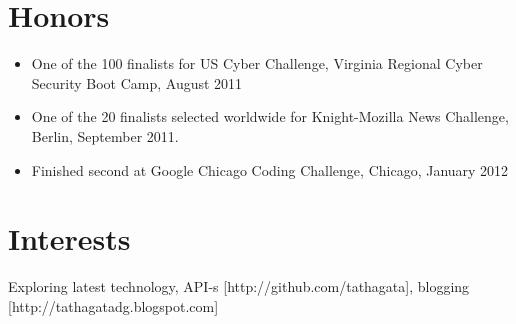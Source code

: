 \documentclass[a4paper, oneside, final]{scrartcl}
\begin{document}
\begin{center}
\begin{tabularx}{0.98\linewidth}{>{\raggedleft\scshape}p{2cm}X}
\end{tabularx}







\section{Honors}
\begin{itemize}
\small\sffamily{}
\item One of the 100 finalists for US Cyber Challenge, Virginia Regional Cyber Security Boot Camp, August 2011
\vspace{-0.3cm}
\item One of the 20 finalists selected worldwide for Knight-Mozilla News Challenge, Berlin, September 2011.
\vspace{-0.3cm}
\item Finished second at Google Chicago Coding Challenge, Chicago, January 2012
\end{itemize} 

\section{Interests}
\small\sffamily{}
Exploring latest technology, API-s [http://github.com/tathagata], blogging [http://tathagatadg.blogspot.com]





\end{center}
\end{document}
